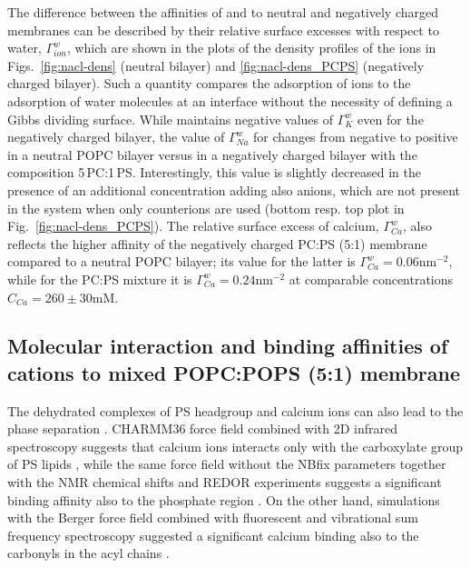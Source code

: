 \documentclass[journal=jpcbfk,manuscript=article]{achemso}
\begin{document}
The difference between the affinities of  and  to neutral and negatively charged membranes
can be described by their relative surface excesses with respect to water, $\Gamma ^{w} _{ion}$, 
which are shown in the plots of the density profiles of the ions in Figs.~\ref{fig:nacl-dens} (neutral bilayer)
and \ref{fig:nacl-dens_PCPS} (negatively charged bilayer). 
Such a quantity compares the adsorption of ions to the adsorption of water molecules at an interface 
without the necessity of defining a Gibbs dividing surface. \citep{melcr18, chattorajBOOK}
While  maintains negative values of $\Gamma^{w}_{K}$ even for the negatively charged bilayer,
the value of $\Gamma^{w}_{Na}$ for  changes from negative to positive
in a neutral POPC bilayer versus in a negatively charged bilayer with the composition 5\,PC:1\,PS.
Interestingly, this value is slightly decreased in the presence of an additional  concentration adding also  anions, 
which are not present in the system when only counterions are used
(bottom resp. top plot in Fig.~\ref{fig:nacl-dens_PCPS}). 
The relative surface excess of calcium, $\Gamma^{w}_{Ca}$, also reflects
the higher affinity of the negatively charged PC:PS (5:1) membrane compared to a neutral POPC bilayer; 
its value for the latter is       $\Gamma^{w}_{Ca} = 0.06\mathrm{nm^{-2}}$, 
while for the PC:PS mixture it is $\Gamma^{w}_{Ca} = 0.24\mathrm{nm^{-2}}$
at comparable concentrations $C _{Ca} = 260\pm 30 \mathrm{mM} $. 


 





 
 


\subsection{Molecular interaction and binding affinities of  cations to mixed POPC:POPS (5:1) membrane} 
\label{section:lip-ion_ca}


The dehydrated complexes of PS headgroup and calcium ions can also lead to the
phase separation \cite{hauser77,kurland79,hauser85,feigenson86,mattai89,roux90,roux91}.
%
CHARMM36 force field \cite{klauda10,venable13} combined with 2D infrared spectroscopy
suggests that calcium ions interacts only with the carboxylate group of PS lipids \cite{valentine18}, while
the same force field without the NBfix parameters together with the NMR chemical shifts and
REDOR experiments suggests a significant binding affinity also to the phosphate region \cite{hallock18}.
On the other hand, simulations with the Berger force field \cite{berger97,mukhopadhyay04}
combined with fluorescent and vibrational sum frequency spectroscopy suggested a significant
calcium binding also to the carbonyls in the acyl chains \cite{melcrova16}. 
\end{document}
